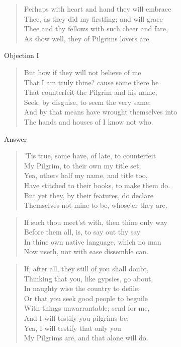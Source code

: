 \begin{verse}
Perhaps with heart and hand they will embrace\\
Thee, as they did my firstling; and will grace\\
Thee and thy fellows with such cheer and fare,\\
As show well, they of Pilgrims lovers are.\\
\end{verse}
Objection I
\begin{verse}
But how if they will not believe of me\\
That I am truly thine? cause some there be\\
That counterfeit the Pilgrim and his name,\\
Seek, by disguise, to seem the very same;\\
And by that means have wrought themselves into\\
The hands and houses of I know not who.\\
\end{verse}
Answer
\begin{verse}
'Tis true, some have, of late, to counterfeit\\
My Pilgrim, to their own my title set;\\
Yea, others half my name, and title too,\\
Have stitched to their books, to make them do.\\
But yet they, by their features, do declare\\
Themselves not mine to be, whose'er they are.\\
\end{verse}
\begin{verse}
If such thou meet'st with, then thine only way\\
Before them all, is, to say out thy say\\
In thine own native language, which no man\\
Now useth, nor with ease dissemble can.\\
\end{verse}
\begin{verse}
If, after all, they still of you shall doubt,\\
Thinking that you, like gypsies, go about,\\
In naughty wise the country to defile;\\
Or that you seek good people to beguile\\
With things unwarrantable; send for me,\\
And I will testify you pilgrims be;\\
Yea, I will testify that only you\\
My Pilgrims are, and that alone will do.\\
\end{verse}
